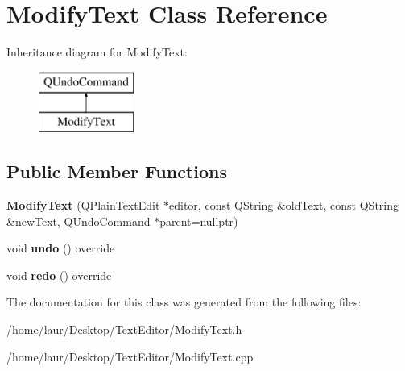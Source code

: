 \hypertarget{class_modify_text}{}\section{Modify\+Text Class Reference}
\label{class_modify_text}
Inheritance diagram for Modify\+Text\+:\begin{figure}[H]
\begin{center}
\leavevmode
\includegraphics[height=2.000000cm]{class_modify_text}
\end{center}
\end{figure}
\subsection*{Public Member Functions}
\begin{DoxyCompactItemize}
\item 
\mbox{\label{class_modify_text_a1b4735d4eeb33f9ef88cf3f33b5e8723}} 
{\bfseries Modify\+Text} (Q\+Plain\+Text\+Edit $\ast$editor, const Q\+String \&old\+Text, const Q\+String \&new\+Text, Q\+Undo\+Command $\ast$parent=nullptr)
\item 
\mbox{\label{class_modify_text_ac6f267ca4f2d3e6dd862975268291dab}} 
void {\bfseries undo} () override
\item 
\mbox{\label{class_modify_text_acf0fe8ee7ad397b66c012afe2aa1999d}} 
void {\bfseries redo} () override
\end{DoxyCompactItemize}


The documentation for this class was generated from the following files\+:\begin{DoxyCompactItemize}
\item 
/home/laur/\+Desktop/\+Text\+Editor/Modify\+Text.\+h\item 
/home/laur/\+Desktop/\+Text\+Editor/Modify\+Text.\+cpp\end{DoxyCompactItemize}
